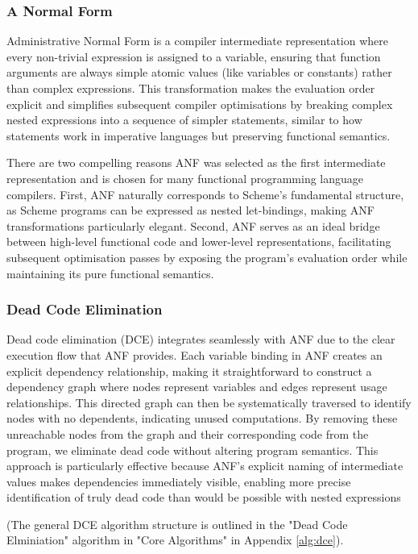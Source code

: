 \documentclass[final]{cmpreport_02}
\begin{document}
\subsubsection{A Normal Form}
Administrative Normal Form \cite{flanagan1993essence} is a compiler intermediate representation where every non-trivial expression is assigned to a variable, ensuring that function arguments are always simple atomic values (like variables or constants) rather than complex expressions. This transformation makes the evaluation order explicit and simplifies subsequent compiler optimisations by breaking complex nested expressions into a sequence of simpler statements, similar to how statements work in imperative languages but preserving functional semantics.\newline

There are two compelling reasons ANF was selected as the first intermediate representation and is chosen for many functional programming language compilers. First, ANF naturally corresponds to Scheme's fundamental structure, as Scheme programs can be expressed as nested let-bindings, making ANF transformations particularly elegant. Second, ANF serves as an ideal bridge between high-level functional code and lower-level representations, facilitating subsequent optimisation passes by exposing the program's evaluation order while maintaining its pure functional semantics.

\subsubsection{Dead Code Elimination}
Dead code elimination (DCE) integrates seamlessly with ANF due to the clear execution flow that ANF provides. Each variable binding in ANF creates an explicit dependency relationship, making it straightforward to construct a dependency graph where nodes represent variables and edges represent usage relationships. This directed graph can then be systematically traversed to identify nodes with no dependents, indicating unused computations. By removing these unreachable nodes from the graph and their corresponding code from the program, we eliminate dead code without altering program semantics. This approach is particularly effective because ANF's explicit naming of intermediate values makes dependencies immediately visible, enabling more precise identification of truly dead code than would be possible with nested expressions

(The general DCE algorithm structure is outlined in the "Dead Code Elminiation" algorithm in "Core Algorithms" in Appendix \ref{alg:dce}).
\end{document}
